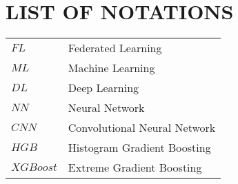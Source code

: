 \chapter{LIST OF NOTATIONS}
\noindent
\begin{longtable}[l]{p{60pt}p{300pt}}

$FL$ 	  &	 	Federated Learning \\ 
$ML$ 	  &	 	Machine Learning \\
$DL$ 	  &	 	Deep Learning \\
$NN$ 	 	&	 	Neural Network \\
$CNN$   &  Convolutional Neural Network \\
$HGB$   & Histogram Gradient Boosting \\
$XGBoost$ & Extreme Gradient Boosting

\end{longtable}

